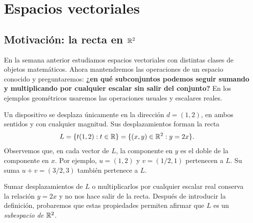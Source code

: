 \documentclass[compacto,10pt]{pubciencias-notas}
\begin{document}
\encabezado
\vspace*{-8mm}
\setcounter{section}{3}
\section{Espacios vectoriales}
\subsection{Motivación: la recta en $\mathbb{R}^2$}

En la semana anterior estudiamos espacios vectoriales con distintas clases
de objetos matemáticos. Ahora mantendremos las operaciones de un espacio conocido y
preguntaremos: \textbf{¿en qué subconjuntos podemos seguir sumando y
multiplicando por cualquier escalar sin salir del conjunto?}
En los ejemplos geométricos usaremos las operaciones usuales y escalares reales.

\begin{ejem}\label{sem06cl01:recta}
    Un dispositivo se desplaza únicamente en la dirección $d=(1,2)$,
    en ambos sentidos y con cualquier magnitud. Sus desplazamientos forman
    la recta
    \[
        L=\{t(1,2):t\in\mathbb{R}\}=\{(x,y)\in\mathbb{R}^2:y=2x\}.
    \]
    Observemos que, en cada vector de $L$, la componente en $y$ es el
    doble de la componente en $x$. Por ejemplo, $u=(1,2)$ y $v=(1/2,1)$
    pertenecen a $L$. Su suma $u+v=(3/2,3)$ también pertenece a $L$.

    Sumar desplazamientos de $L$ o multiplicarlos por cualquier escalar
    real conserva la relación $y=2x$ y no nos hace salir de la recta.
    Después de introducir la definición, probaremos que estas propiedades
    permiten afirmar que $L$ es un \emph{subespacio de $\mathbb{R}^2$}.
\end{ejem}

\begin{center}
\end{center}
\end{document}
